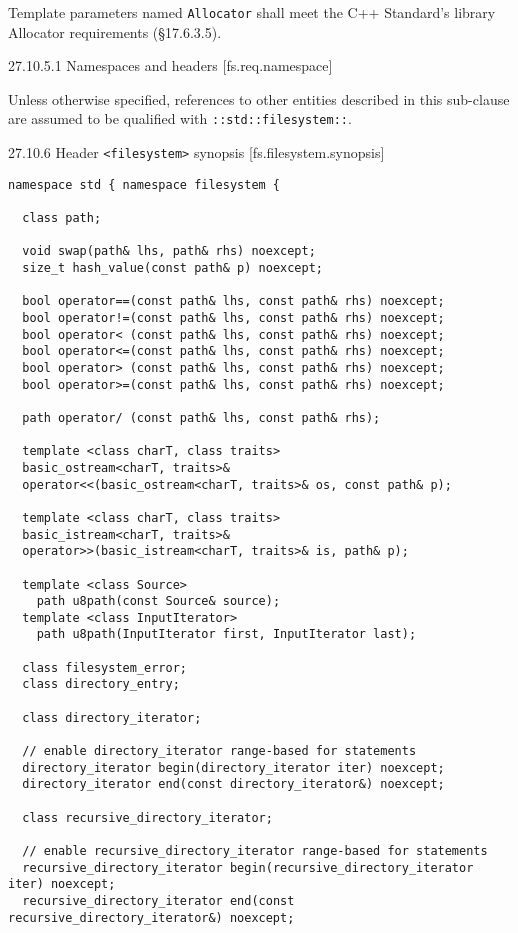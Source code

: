 Template parameters named \texttt{Allocator} shall meet the C++
Standard's library Allocator requirements (§17.6.3.5).

27.10.5.1 Namespaces and headers {[}fs.req.namespace{]}

Unless otherwise specified, references to other entities described in
this sub-clause are assumed to be qualified with
\texttt{::std::filesystem::}.

27.10.6 Header \texttt{\textless{}filesystem\textgreater{}} synopsis
{[}fs.filesystem.synopsis{]}

\begin{verbatim}
namespace std { namespace filesystem {

  class path;
  
  void swap(path& lhs, path& rhs) noexcept;
  size_t hash_value(const path& p) noexcept;

  bool operator==(const path& lhs, const path& rhs) noexcept;
  bool operator!=(const path& lhs, const path& rhs) noexcept;
  bool operator< (const path& lhs, const path& rhs) noexcept;
  bool operator<=(const path& lhs, const path& rhs) noexcept;
  bool operator> (const path& lhs, const path& rhs) noexcept;
  bool operator>=(const path& lhs, const path& rhs) noexcept;

  path operator/ (const path& lhs, const path& rhs);

  template <class charT, class traits>
  basic_ostream<charT, traits>&
  operator<<(basic_ostream<charT, traits>& os, const path& p);

  template <class charT, class traits>
  basic_istream<charT, traits>&
  operator>>(basic_istream<charT, traits>& is, path& p);

  template <class Source>  
    path u8path(const Source& source);
  template <class InputIterator>
    path u8path(InputIterator first, InputIterator last);

  class filesystem_error;      
  class directory_entry;

  class directory_iterator;

  // enable directory_iterator range-based for statements
  directory_iterator begin(directory_iterator iter) noexcept;
  directory_iterator end(const directory_iterator&) noexcept;

  class recursive_directory_iterator;

  // enable recursive_directory_iterator range-based for statements
  recursive_directory_iterator begin(recursive_directory_iterator iter) noexcept;
  recursive_directory_iterator end(const recursive_directory_iterator&) noexcept;


\end{verbatim}

